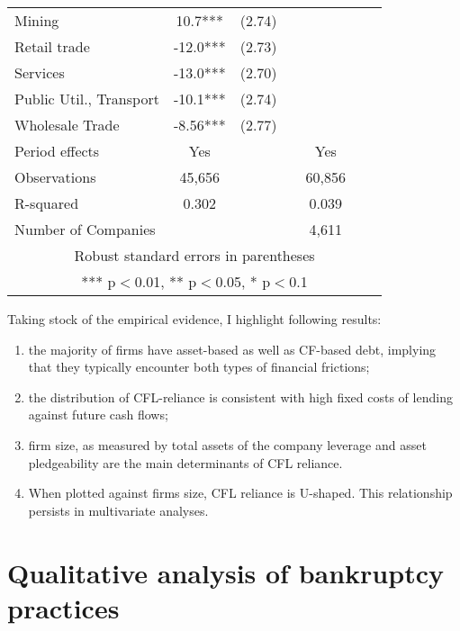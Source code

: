\documentclass[12pt]{article}
\begin{document}
\begin{table}[H]
\begin{tabular}{lcccccc}
    Mining & 10.7*** & (2.74) & & & & \\
    Retail trade & -12.0*** & (2.73) & & & & \\
    Services & -13.0*** & (2.70) & & & & \\
    Public Util., Transport & -10.1*** & (2.74) & & & & \\
    Wholesale Trade  & -8.56*** & (2.77) & & & & \vspace{2mm} \\
    \hline
    Period effects & Yes & & & Yes & & \\
    Observations & 45,656 & & & 60,856 & & \\
    R-squared & 0.302 & & & 0.039 & & \\
    Number of Companies & & & & 4,611 & & \\
    \bottomrule
    \multicolumn{7}{c}{Robust standard errors in parentheses} \\
    \multicolumn{7}{c}{*** p$<$0.01, ** p$<$0.05, * p$<$0.1} \\
    \end{tabular}%
    \end{table}


\noindent Taking stock of the empirical evidence, I highlight following results:
\begin{enumerate}[i]
    \item the majority of firms have asset-based as well as CF-based debt, implying that they typically encounter both types of financial frictions;
    \item the distribution of CFL-reliance is consistent with high fixed costs of lending against future cash flows;
    \item firm size, as measured by total assets of the company leverage and asset pledgeability are the main determinants of CFL reliance.
    \item When plotted against firms size, CFL reliance is U-shaped. This relationship persists in multivariate analyses.
\end{enumerate}

\section{Qualitative analysis of bankruptcy practices \label{sec: qualitative analysis}}
\end{document}
